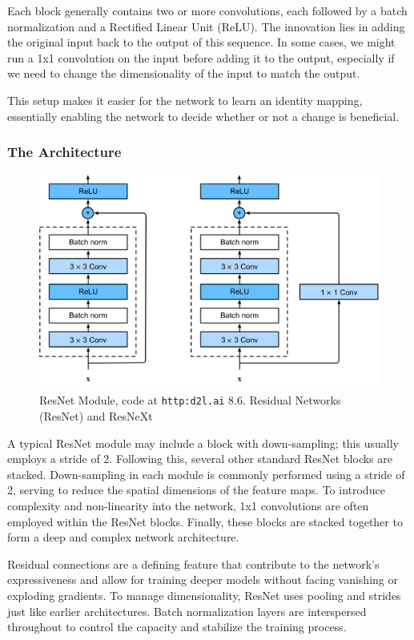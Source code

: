 \documentclass[11pt]{article}
\begin{document}
Each block generally contains two or more convolutions, each followed by a batch normalization and a Rectified Linear Unit (ReLU). The innovation lies in adding the original input back to the output of this sequence. In some cases, we might run a 1x1 convolution on the input before adding it to the output, especially if we need to change the dimensionality of the input to match the output.

This setup makes it easier for the network to learn an identity mapping, essentially enabling the network to decide whether or not a change is beneficial.



\subsubsection{The Architecture}

\begin{figure}[H]
    \centering
    \includegraphics[width=.5\linewidth]{figures/resnet-block.png}
    \caption{ResNet Module, code at \texttt{http:d2l.ai} 8.6. Residual Networks (ResNet) and ResNeXt}
\end{figure}

A typical ResNet module may include a block with down-sampling; this usually employs a stride of 2. Following this, several other standard ResNet blocks are stacked. Down-sampling in each module is commonly performed using a stride of 2, serving to reduce the spatial dimensions of the feature maps. To introduce complexity and non-linearity into the network, 1x1 convolutions are often employed within the ResNet blocks. Finally, these blocks are stacked together to form a deep and complex network architecture.

Residual connections are a defining feature that contribute to the network's expressiveness and allow for training deeper models without facing vanishing or exploding gradients. To manage dimensionality, ResNet uses pooling and strides just like earlier architectures. Batch normalization layers are interspersed throughout to control the capacity and stabilize the training process.
\end{document}
